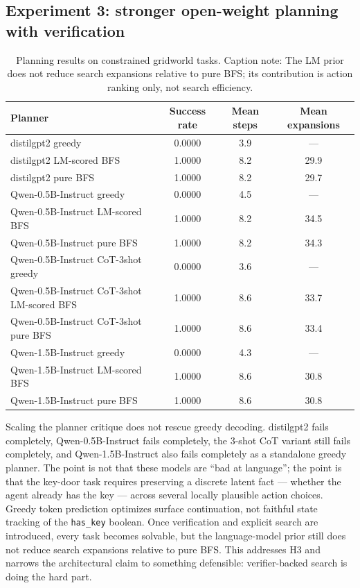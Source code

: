 \documentclass[11pt]{article}
\begin{document}
\subsection{Experiment 3: stronger open-weight planning with verification}
\begin{table}[t]
    \centering
    \caption{Planning results on constrained gridworld tasks. Caption note: The LM prior does not reduce search expansions relative to pure BFS; its contribution is action ranking only, not search efficiency.}
    \begin{tabular}{lccc}
        \toprule
        Planner & Success rate & Mean steps & Mean expansions \\
        \midrule
        distilgpt2 greedy & 0.0000 & 3.9 & --- \\
        distilgpt2 LM-scored BFS & 1.0000 & 8.2 & 29.9 \\
        distilgpt2 pure BFS & 1.0000 & 8.2 & 29.7 \\
        \midrule
        Qwen-0.5B-Instruct greedy & 0.0000 & 4.5 & --- \\
        Qwen-0.5B-Instruct LM-scored BFS & 1.0000 & 8.2 & 34.5 \\
        Qwen-0.5B-Instruct pure BFS & 1.0000 & 8.2 & 34.3 \\
        \midrule
        Qwen-0.5B-Instruct CoT-3shot greedy & 0.0000 & 3.6 & --- \\
        Qwen-0.5B-Instruct CoT-3shot LM-scored BFS & 1.0000 & 8.6 & 33.7 \\
        Qwen-0.5B-Instruct CoT-3shot pure BFS & 1.0000 & 8.6 & 33.4 \\
        \midrule
        Qwen-1.5B-Instruct greedy & 0.0000 & 4.3 & --- \\
        Qwen-1.5B-Instruct LM-scored BFS & 1.0000 & 8.6 & 30.8 \\
        Qwen-1.5B-Instruct pure BFS & 1.0000 & 8.6 & 30.8 \\
        \bottomrule
    \end{tabular}
    \label{tab:planning}
\end{table}

Scaling the planner critique does not rescue greedy decoding. distilgpt2 fails completely, Qwen-0.5B-Instruct fails completely, the 3-shot CoT variant still fails completely, and Qwen-1.5B-Instruct also fails completely as a standalone greedy planner. The point is not that these models are ``bad at language''; the point is that the key-door task requires preserving a discrete latent fact --- whether the agent already has the key --- across several locally plausible action choices. Greedy token prediction optimizes surface continuation, not faithful state tracking of the \texttt{has\_key} boolean. Once verification and explicit search are introduced, every task becomes solvable, but the language-model prior still does not reduce search expansions relative to pure BFS. This addresses H3 and narrows the architectural claim to something defensible: verifier-backed search is doing the hard part.
\end{document}
